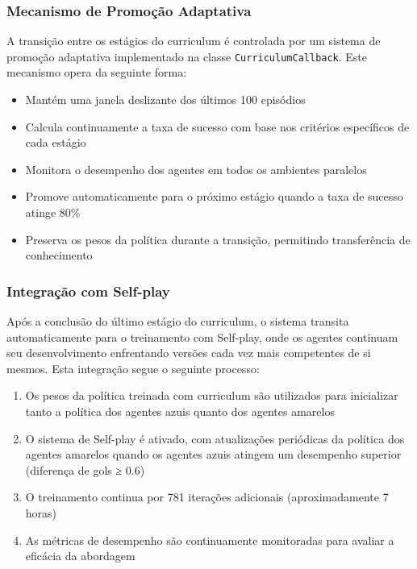 \subsubsection{Mecanismo de Promoção Adaptativa}

A transição entre os estágios do curriculum é controlada por um sistema de promoção adaptativa implementado na classe \texttt{CurriculumCallback}. Este mecanismo opera da seguinte forma:

\begin{itemize}
    \item Mantém uma janela deslizante dos últimos 100 episódios
    \item Calcula continuamente a taxa de sucesso com base nos critérios específicos de cada estágio
    \item Monitora o desempenho dos agentes em todos os ambientes paralelos
    \item Promove automaticamente para o próximo estágio quando a taxa de sucesso atinge 80\%
    \item Preserva os pesos da política durante a transição, permitindo transferência de conhecimento
\end{itemize}

\subsubsection{Integração com Self-play}

Após a conclusão do último estágio do curriculum, o sistema transita automaticamente para o treinamento com Self-play, onde os agentes continuam seu desenvolvimento enfrentando versões cada vez mais competentes de si mesmos. Esta integração segue o seguinte processo:

\begin{enumerate}
    \item Os pesos da política treinada com curriculum são utilizados para inicializar tanto a política dos agentes azuis quanto dos agentes amarelos
    \item O sistema de Self-play é ativado, com atualizações periódicas da política dos agentes amarelos quando os agentes azuis atingem um desempenho superior (diferença de gols ≥ 0.6)
    \item O treinamento continua por 781 iterações adicionais (aproximadamente 7 horas)
    \item As métricas de desempenho são continuamente monitoradas para avaliar a eficácia da abordagem
\end{enumerate}

